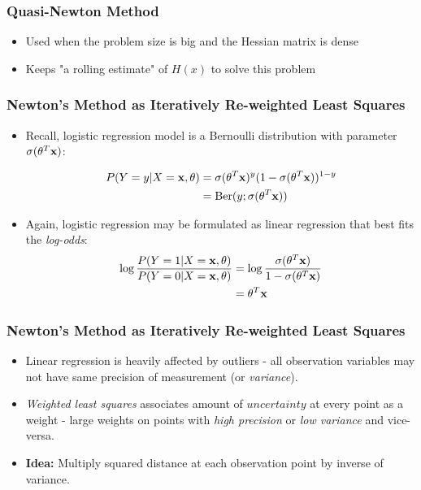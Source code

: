           

\begin{frame}
\frametitle{Quasi-Newton Method}

\begin{itemize}
\item Used when the problem size is big and the Hessian matrix is dense
\item Keeps "a rolling estimate" of $H(x)$ to solve this problem
\end{itemize}

  \end{frame}
  
\begin{frame}
\frametitle{Newton's Method as Iteratively Re-weighted Least Squares}
\begin{itemize}
\item Recall, logistic regression model is a Bernoulli distribution with parameter $\sigma(\theta^T \textbf{x})$:

\begin{equation}
\begin{split}
P(Y=y|X=\mathbf{x},\theta) &= \sigma(\theta^T \textbf{x})^y (1 - \sigma(\theta^T \textbf{x}))^{1-y}\\
&= \text{Ber}(y; \sigma(\theta^T \textbf{x}))
\end{split}
\end{equation}

\item Again, logistic regression may be formulated as linear regression that best fits the \textit{log-odds}:
\begin{equation}
\begin{split}
\log \frac{P(Y=1|X=\mathbf{x},\theta)}{P(Y=0|X=\mathbf{x},\theta)} &= \log \frac{\sigma(\theta^T \textbf{x})}{1 - \sigma(\theta^T \textbf{x})}\\
&= \theta^T \mathbf{x}
\end{split}
\end{equation}

\end{itemize}
\end{frame}

\begin{frame}
\frametitle{Newton's Method as Iteratively Re-weighted Least Squares}
\begin{itemize}
\item Linear regression is heavily affected by outliers - all observation variables may not have same precision of measurement (or \textit{variance}).
\item \textit{Weighted least squares} associates amount of $uncertainty$ at every point as a weight - large weights on points with \textit{high precision} or \textit{low variance} and vice-versa.
\item \textbf{Idea:} Multiply squared distance at each observation point by inverse of variance.
\end{itemize}
\end{frame}

